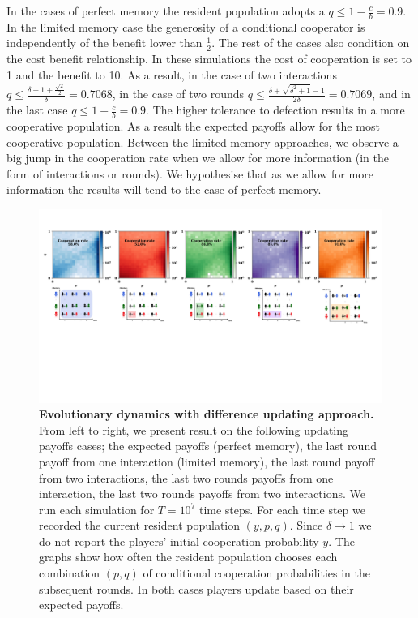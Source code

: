 \documentclass[11pt]{article}
\theoremstyle{plainCl1}
\theoremstyle{plainCl2}
\begin{document}
In the cases of perfect memory the resident population adopts a \(q \leq 1 -
\frac{c}{b}=0.9\). In the limited memory case the generosity of a conditional
cooperator is independently of the benefit lower than \(\frac{1}{2}\). The rest
of the cases also condition on the cost benefit relationship. In these
simulations the cost of cooperation is set to 1 and the benefit to 10. As a
result, in the case of two interactions \(q \leq \frac{\delta - 1 +
\frac{\sqrt{2}}{2}}{\delta}=0.7068\), in the case of two rounds \(q \leq
\frac{\delta + \sqrt{\delta^{2} + 1} - 1}{2 \delta}=0.7069\), and in the last
case \(q \leq 1 - \frac{c}{b}=0.9\). The higher tolerance to defection results
in a more cooperative population. As a result the expected payoffs allow for the
most cooperative population. Between the limited memory approaches, we observe a
big jump in the cooperation rate when we allow for more information
(in the form of interactions or rounds). We hypothesise that as we
allow for more information the results will tend to the case of perfect memory.

\begin{figure}[!htbp]
    \centering 
    \includegraphics[width=\textwidth]{static/more_memory_heatmaps_donation_game_with_illustrations.pdf}
    \caption{\textbf{Evolutionary dynamics with difference updating approach.}
    From left to right, we present result on the following updating payoffs
    cases; the expected payoffs (perfect memory), the last round payoff
    from one interaction (limited memory), the last round payoff from two
    interactions, the last two rounds payoffs from one interaction, the
    last two rounds payoffs from two interactions. We run each simulation for \(T
    = 10^7\) time steps. For each time step we recorded the current resident
    population \((y, p, q)\). Since \(\delta \rightarrow 1\) we do not report the
    players' initial cooperation probability \(y\). The graphs show how often the
    resident population chooses each combination \((p, q)\) of conditional
    cooperation probabilities in the subsequent rounds. In both cases players
    update based on their expected payoffs.}\label{fig:expected_payoffs_results}
\end{figure}
\end{document}
